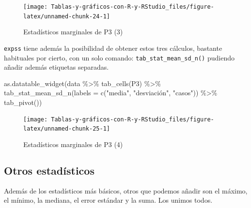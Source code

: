 \documentclass[
]{book}
\newenvironment{Shaded}{\begin{snugshade}}{\end{snugshade}}
\newcommand{\AttributeTok}[1]{\textcolor[rgb]{0.77,0.63,0.00}{#1}}
\newcommand{\FunctionTok}[1]{\textcolor[rgb]{0.00,0.00,0.00}{#1}}
\newcommand{\NormalTok}[1]{#1}
\newcommand{\SpecialCharTok}[1]{\textcolor[rgb]{0.00,0.00,0.00}{#1}}
\newcommand{\StringTok}[1]{\textcolor[rgb]{0.31,0.60,0.02}{#1}}
\begin{document}
\begin{figure}[H]

{\centering \texttt{[image: Tablas-y-gráficos-con-R-y-RStudio\_files/figure-latex/unnamed-chunk-24-1]} 

}

\caption{Estadísticos marginales de P3 (3)}\label{fig:unnamed-chunk-24}
\end{figure}

\texttt{expss} tiene además la posibilidad de obtener estos tres cálculos, bastante habituales por cierto, con un solo comando: \texttt{tab\_stat\_mean\_sd\_n()} pudiendo añadir además etiquetas separadas.

\begin{Shaded}
\begin{Highlighting}[]
\FunctionTok{as.datatable\_widget}\NormalTok{(data }\SpecialCharTok{\%\textgreater{}\%} \FunctionTok{tab\_cells}\NormalTok{(P3) }\SpecialCharTok{\%\textgreater{}\%} \FunctionTok{tab\_stat\_mean\_sd\_n}\NormalTok{(}\AttributeTok{labels =} \FunctionTok{c}\NormalTok{(}\StringTok{"media"}\NormalTok{, }
  \StringTok{"desviación"}\NormalTok{, }\StringTok{"casos"}\NormalTok{)) }\SpecialCharTok{\%\textgreater{}\%} \FunctionTok{tab\_pivot}\NormalTok{())}
\end{Highlighting}
\end{Shaded}

\begin{figure}[H]

{\centering \texttt{[image: Tablas-y-gráficos-con-R-y-RStudio\_files/figure-latex/unnamed-chunk-25-1]} 

}

\caption{Estadísticos marginales de P3 (4)}\label{fig:unnamed-chunk-25}
\end{figure}

\hypertarget{otros-estaduxedsticos}{%
\subsection{Otros estadísticos}\label{otros-estaduxedsticos}}

Además de los estadísticos más básicos, otros que podemos añadir son el máximo, el mínimo, la mediana, el error estándar y la suma. Los unimos todos.
\end{document}
